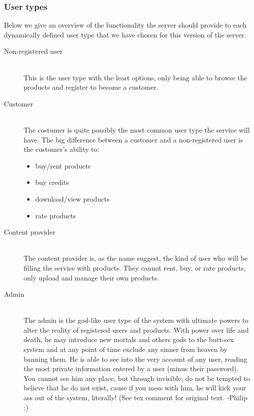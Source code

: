 \subsubsection{User types}
\label{s_actor-goal-list}
Below we give an overview of the functionality the server should provide to each dynamically defined user type that we have chosen for this version of the server.

\begin{description}
	\item [Non-registered user] \hfill \\
		This is the user type with the least options, only being able to browse the products and register to become a customer.
	\item [Customer]  \hfill \\
		The costumer is quite possibly the most common user type the service will have. The big difference between a customer and a non-registered user is the customer's ability to:
		\begin{itemize}
			\item buy/rent products
			\item buy credits
			\item download/view products
			\item rate products
		\end{itemize}
	\item [Content provider] \hfill \\
		The content provider is, as the name suggest, the kind of user who will be filling the service with products. They cannot rent, buy, or rate products, only upload and manage their own products. 
	\item [Admin] \hfill \\
		The admin is the god-like user type of the system with ultimate powers to alter the reality of registered users and products. With power over life and death, he may introduce new mortals and others gods to the butt-sex  system and at any point of time exclude any sinner from heaven by banning them. He is able to see into the very account of any user, reading the most private information entered by a user (minus their password). You cannot see him any place, but through invisible, do not be tempted to believe that he do not exist, cause if you mess with him, he will kick your ass out of the system, literally! (See tex comment for original text. -Philip :)
\end{description}